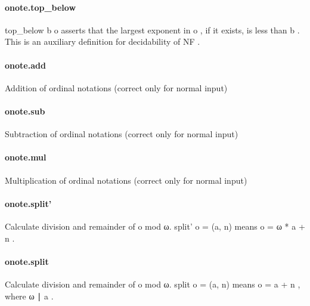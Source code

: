 \documentclass{article}
\begin{document}
\paragraph{onote.top\_below}
\par
\colorbox[RGB]{253,246,227}{{{{\color[RGB]{101, 123, 131} top\_below b o }}}} asserts that the largest exponent in 
\colorbox[RGB]{253,246,227}{{{{\color[RGB]{101, 123, 131} o }}}}, if
it exists, is less than 
\colorbox[RGB]{253,246,227}{{{{\color[RGB]{101, 123, 131} b }}}}. This is an auxiliary definition
for decidability of 
\colorbox[RGB]{253,246,227}{{{{\color[RGB]{101, 123, 131} NF }}}}.
\paragraph{onote.add}
\par
Addition of ordinal notations (correct only for normal input)
\paragraph{onote.sub}
\par
Subtraction of ordinal notations (correct only for normal input)
\paragraph{onote.mul}
\par
Multiplication of ordinal notations (correct only for normal input)
\paragraph{onote.split'}
\par
Calculate division and remainder of 
\colorbox[RGB]{253,246,227}{{{{\color[RGB]{101, 123, 131} o }}}} mod ω.
\colorbox[RGB]{253,246,227}{{{{\color[RGB]{101, 123, 131} split' o  }}}{{{\color[RGB]{181, 137, 0} = }}}{{{\color[RGB]{101, 123, 131}  (a, n) }}}} means 
\colorbox[RGB]{253,246,227}{{{{\color[RGB]{101, 123, 131} o  }}}{{{\color[RGB]{181, 137, 0} = }}}{{{\color[RGB]{101, 123, 131}  ω  }}}{{{\color[RGB]{181, 137, 0} * }}}{{{\color[RGB]{101, 123, 131}  a  }}}{{{\color[RGB]{181, 137, 0} + }}}{{{\color[RGB]{101, 123, 131}  n }}}}.
\paragraph{onote.split}
\par
Calculate division and remainder of 
\colorbox[RGB]{253,246,227}{{{{\color[RGB]{101, 123, 131} o }}}} mod ω.
\colorbox[RGB]{253,246,227}{{{{\color[RGB]{101, 123, 131} split o  }}}{{{\color[RGB]{181, 137, 0} = }}}{{{\color[RGB]{101, 123, 131}  (a, n) }}}} means 
\colorbox[RGB]{253,246,227}{{{{\color[RGB]{101, 123, 131} o  }}}{{{\color[RGB]{181, 137, 0} = }}}{{{\color[RGB]{101, 123, 131}  a  }}}{{{\color[RGB]{181, 137, 0} + }}}{{{\color[RGB]{101, 123, 131}  n }}}}, where 
\colorbox[RGB]{253,246,227}{{{{\color[RGB]{101, 123, 131} ω ∣ a }}}}.
\end{document}
